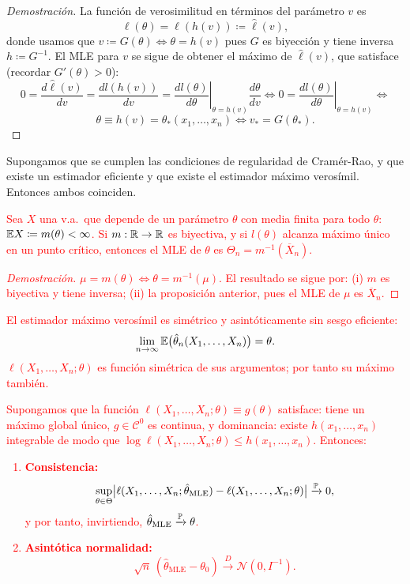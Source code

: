 \begin{proof}[Demostración]
La función de verosimilitud en términos del parámetro $v$ es
\[
  \ell(\theta) = \ell(h(v)) \coloneqq \hat{\ell}(v),
\]
donde usamos que $v \coloneqq G(\theta) \iff \theta = h(v)$ pues $G$ es biyección y tiene inversa $h \coloneqq G^{-1}$. El MLE para $v$ se sigue de obtener el máximo de $\hat{\ell}(v)$, que satisface (recordar $G'(\theta) > 0$):
\[
  0 = \frac{d\hat{\ell}(v)}{dv} = \frac{dl(h(v))}{dv} = \left.\frac{dl(\theta)}{d\theta}\right|_{\theta = h(v)} \frac{d\theta}{dv} \iff 0 = \left.\frac{dl(\theta)}{d\theta}\right|_{\theta = h(v)} \iff \]
  \[ \theta \equiv h(v) = \theta_*(x_1, \dots, x_n) \iff v_* = G(\theta_*).
\]
\end{proof}

\begin{proposicion}[2]
Supongamos que se cumplen las condiciones de regularidad de Cramér-Rao, y que existe un estimador eficiente y que existe el estimador máximo verosímil. Entonces ambos coinciden.
\end{proposicion}
\textcolor{red}{
\begin{proposicion}[3]
Sea $X$ una v.a.\ que depende de un parámetro $\theta$ con media finita para todo $\theta$: $\mathbb{E} X \coloneqq m(\theta) < \infty$. Si $m : \mathbb{R} \to \mathbb{R}$ es biyectiva, y si $l(\theta)$ alcanza máximo único en un punto crítico, entonces el MLE de $\theta$ es $\Theta_n = m^{-1}(\overline{X}_n)$.
\end{proposicion}
\begin{proof}[Demostración]
$\mu = m(\theta) \iff \theta = m^{-1}(\mu)$. El resultado se sigue por: (i) $m$ es biyectiva y tiene inversa; (ii) la proposición anterior, pues el MLE de $\mu$ es $\overline{X}_n$.
\end{proof}
\begin{proposicion}[4]
El estimador máximo verosímil es simétrico y asintóticamente sin sesgo eficiente:
\[
  \lim_{n\to\infty} \mathbb{E}\bigl(\hat{\theta}_n(X_1, \dots, X_n)\bigr) = \theta.
\]
$\ell(X_1, \dots, X_n; \theta)$ es función simétrica de sus argumentos; por tanto su máximo también.
\end{proposicion}
\begin{teorema}[1]
Supongamos que la función $\ell (X_1, \dots, X_n; \theta) \equiv g(\theta)$ satisface: tiene un máximo global único, $g \in \mathcal{C}^0$ es continua, y dominancia: existe $h(x_1, \dots, x_n)$ integrable de modo que $\log \ell(X_1, \dots, X_n; \theta) \le h(x_1, \dots, x_n)$. Entonces:
\begin{enumerate}
  \item \textbf{Consistencia:}
  \[
    \sup_{\theta \in \Theta} \bigl|\ell(X_1, \dots, X_n; \hat{\theta}_{\text{MLE}}) - \ell(X_1, \dots, X_n; \theta)\bigr| \xrightarrow{\mathbb{P}} 0,
  \]
  y por tanto, invirtiendo, $\hat{\theta}_{\text{MLE}} \xrightarrow{\mathbb{P}} \theta$.
  \item \textbf{Asintótica normalidad:}
  \[
    \sqrt{n}\,(\hat{\theta}_{\text{MLE}} - \theta_0) \xrightarrow{D} \mathcal{N}(0, I^{-1}).
  \]
\end{enumerate}
\end{teorema}}

